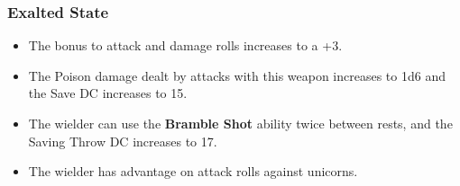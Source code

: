 {\subsubsection*{Exalted State}
\begin{itemize}
	\item The bonus to attack and damage rolls increases to a +3.
	\item The Poison damage dealt by attacks with this weapon increases to 1d6 and the Save DC increases to 15.
	\item The wielder can use the \textbf{Bramble Shot} ability twice between rests, and the Saving Throw DC increases to 17.
	\item The wielder has advantage on attack rolls against unicorns.
\end{itemize}}